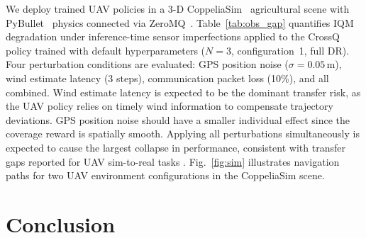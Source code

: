 \documentclass{article}
\begin{document}
We deploy trained UAV policies in a 3-D CoppeliaSim~\citep{coppeliaSim2013} agricultural scene with PyBullet~\citep{coumans2021pybullet} physics connected via ZeroMQ~\citep{ZeroMQ}. Table~\ref{tab:obs_gap} quantifies IQM degradation under inference-time sensor imperfections applied to the CrossQ policy trained with default hyperparameters ($N\!=\!3$, configuration~1, full DR). Four perturbation conditions are evaluated: GPS position noise ($\sigma\!=\!0.05$\,m), wind estimate latency (3 steps), communication packet loss (10\%), and all combined. Wind estimate latency is expected to be the dominant transfer risk, as the UAV policy relies on timely wind information to compensate trajectory deviations. GPS position noise should have a smaller individual effect since the coverage reward is spatially smooth. Applying all perturbations simultaneously is expected to cause the largest collapse in performance, consistent with transfer gaps reported for UAV sim-to-real tasks \citep{peng2018sim2real, akkaya2019solving}. Fig.~\ref{fig:sim} illustrates navigation paths for two UAV environment configurations in the CoppeliaSim scene.


\section{Conclusion}
\label{sec:con}
\end{document}
